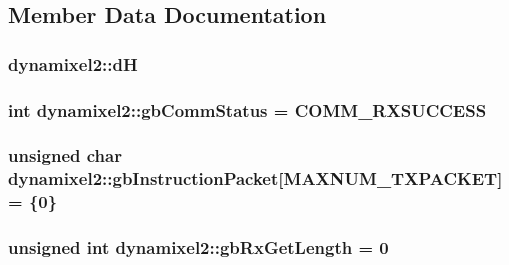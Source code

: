 \subsection{Member Data Documentation}
\hypertarget{classdynamixel2_a69e9133771b69c828c277cb7191d3474}{}
\subsubsection[{d\+H}]{ dynamixel2\+::d\+H\hspace{0.3cm}{\ttfamily [private]}}\label{classdynamixel2_a69e9133771b69c828c277cb7191d3474}
\hypertarget{classdynamixel2_a703e327ba8ec5909c238dc94a00cb32d}{}
\subsubsection[{gb\+Comm\+Status}]{\setlength{\rightskip}{0pt plus 5cm}int dynamixel2\+::gb\+Comm\+Status = {\bf C\+O\+M\+M\+\_\+\+R\+X\+S\+U\+C\+C\+E\+S\+S}\hspace{0.3cm}{\ttfamily [private]}}\label{classdynamixel2_a703e327ba8ec5909c238dc94a00cb32d}
\hypertarget{classdynamixel2_a298efe9115fdbf77019af1001e801fb4}{}
\subsubsection[{gb\+Instruction\+Packet}]{\setlength{\rightskip}{0pt plus 5cm}unsigned char dynamixel2\+::gb\+Instruction\+Packet\mbox{[}{\bf M\+A\+X\+N\+U\+M\+\_\+\+T\+X\+P\+A\+C\+K\+E\+T}\mbox{]} = \{0\}\hspace{0.3cm}{\ttfamily [private]}}\label{classdynamixel2_a298efe9115fdbf77019af1001e801fb4}
\hypertarget{classdynamixel2_ad82d286e6b47c7243a3c5fd5ced0ebf4}{}
\subsubsection[{gb\+Rx\+Get\+Length}]{\setlength{\rightskip}{0pt plus 5cm}unsigned int dynamixel2\+::gb\+Rx\+Get\+Length = 0\hspace{0.3cm}{\ttfamily [private]}}\label{classdynamixel2_ad82d286e6b47c7243a3c5fd5ced0ebf4}
\hypertarget{classdynamixel2_a7ae9bffcc9f4b087c57640881ccbb378}{}
